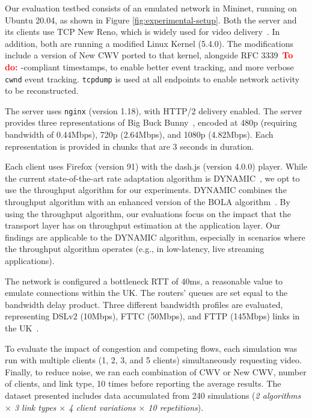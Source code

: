 \documentclass[10pt,sigconf,anonymous]{acmart}
\newcommand{\todo}[1]{\textbf{\textcolor{red}{To do: #1}}}
\begin{document}
Our evaluation testbed consists of an emulated network in Mininet, running on Ubuntu 20.04, as shown in Figure \ref{fig:experimental-setup}. Both the server and its clients use TCP New Reno, which is widely used for video delivery~\cite{Mishra-2019-the-great-internet-tcp-congestion-control-census}. In addition, both are running a modified Linux Kernel (5.4.0). The modifications include a version of New CWV ported to that kernel, alongside RFC 3339~\todo{\cite{..}}-compliant timestamps, to enable better event tracking, and more verbose \texttt{cwnd} event tracking. \texttt{tcpdump} is used at all endpoints to enable network activity to be reconstructed.

The server uses \texttt{nginx} (version 1.18), with HTTP/2 delivery enabled. The server provides three representations of Big Buck Bunny~\cite{online-bbb}, encoded at 480p (requiring bandwidth of 0.44Mbps), 720p (2.64Mbps), and 1080p (4.82Mbps). Each representation is provided in chunks that are 3 seconds in duration.

Each client uses Firefox (version 91) with the dash.js (version 4.0.0) player. While the current state-of-the-art rate adaptation algorithm is DYNAMIC~\cite{Spiteri-2019-from-theory-to-practice-sabre}, we opt to use the throughput algorithm for our experiments. DYNAMIC combines the throughput algorithm with an enhanced version of the BOLA algorithm~\cite{Spiteri-2016-BOLA}. By using the throughput algorithm, our evaluations focus on the impact that the transport layer has on throughput estimation at the application layer. Our findings are applicable to the DYNAMIC algorithm, especially in scenarios where the throughput algorithm operates (e.g., in low-latency, live streaming applications).

The network is configured a bottleneck RTT of 40ms, a reasonable value to emulate connections within the UK. The routers' queues are set equal to the bandwidth delay product. Three different bandwidth profiles are evaluated, representing DSLv2 (10Mbps), FTTC (50Mbps), and FTTP (145Mbps) links in the UK~\cite{online-ofcom-report}.

To evaluate the impact of congestion and competing flows, each simulation was run with multiple clients (1, 2, 3, and 5 clients) simultaneously requesting video. Finally, to reduce noise, we ran each combination of CWV or New CWV, number of clients, and link type, 10 times before reporting the average results. The dataset presented includes data accumulated from 240 simulations (\emph{2 algorithms $\times$ 3 link types $\times$ 4 client variations $\times$ 10 repetitions}). 
\end{document}
